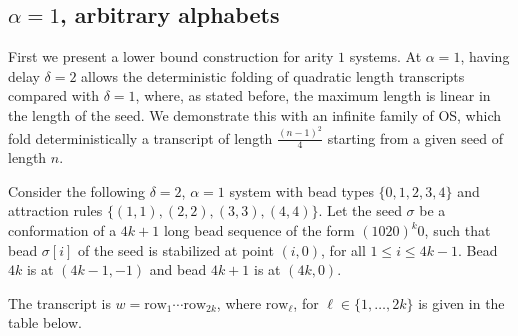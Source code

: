 

\subsection{$\alpha = 1$, arbitrary alphabets}
First we present a lower bound construction for arity $1$ systems. At $\alpha=1$, having delay $\delta=2$ allows the deterministic folding of quadratic length transcripts compared with $\delta=1$, where, as stated before, the maximum length is linear in the length of the seed. We demonstrate this with an infinite family of OS, which fold deterministically a transcript of length $\frac{(n-1)^2}{4}$ starting from a given seed of length $n$.

Consider the following $\delta=2$, $\alpha=1$ system with bead types $\{0,1,2,3,4\}$ and attraction rules $\{(1,1),(2,2), (3,3),(4,4)\}$. Let the seed $\sigma$ be a conformation of a $4k+1$ long bead sequence of the form $(1020)^k0$, such that bead $\sigma[i]$ of the seed is stabilized at point $(i,0)$, for all $1\leq i\leq 4k-1$. Bead $4k$ is at $(4k-1,-1)$ and bead $4k+1$ is at $(4k,0)$.

The transcript is $w=\mathrm{row}_1\cdots \mathrm{row}_{2k}$, where $\mathrm{row}_\ell$, for $\ell\in \{1,\dots, 2k\}$ is given in the table below.

